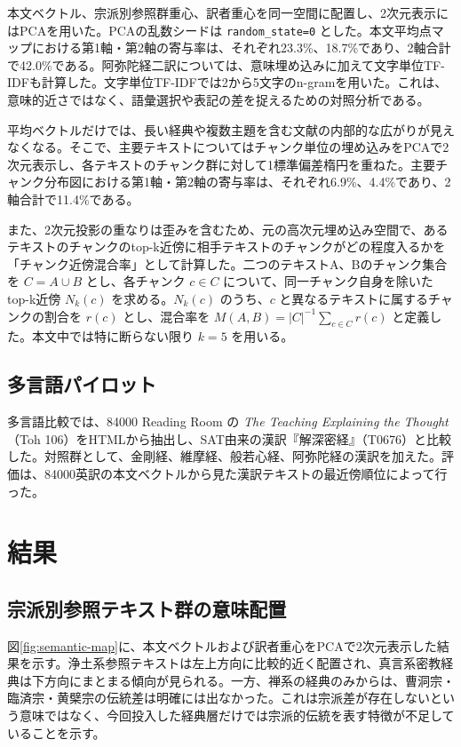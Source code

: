 \documentclass[uplatex,dvipdfmx,11pt,a4paper]{jsarticle}
\begin{document}
本文ベクトル、宗派別参照群重心、訳者重心を同一空間に配置し、2次元表示にはPCAを用いた。PCAの乱数シードは \texttt{random\_state=0} とした。本文平均点マップにおける第1軸・第2軸の寄与率は、それぞれ23.3\%、18.7\%であり、2軸合計で42.0\%である。阿弥陀経二訳については、意味埋め込みに加えて文字単位TF-IDFも計算した。文字単位TF-IDFでは2から5文字のn-gramを用いた。これは、意味的近さではなく、語彙選択や表記の差を捉えるための対照分析である。

平均ベクトルだけでは、長い経典や複数主題を含む文献の内部的な広がりが見えなくなる。そこで、主要テキストについてはチャンク単位の埋め込みをPCAで2次元表示し、各テキストのチャンク群に対して1標準偏差楕円を重ねた。主要チャンク分布図における第1軸・第2軸の寄与率は、それぞれ6.9\%、4.4\%であり、2軸合計で11.4\%である。

また、2次元投影の重なりは歪みを含むため、元の高次元埋め込み空間で、あるテキストのチャンクのtop-k近傍に相手テキストのチャンクがどの程度入るかを「チャンク近傍混合率」として計算した。二つのテキストA、Bのチャンク集合を $C=A\cup B$ とし、各チャンク $c\in C$ について、同一チャンク自身を除いたtop-k近傍 $N_k(c)$ を求める。$N_k(c)$ のうち、$c$ と異なるテキストに属するチャンクの割合を $r(c)$ とし、混合率を $M(A,B)=|C|^{-1}\sum_{c\in C} r(c)$ と定義した。本文中では特に断らない限り $k=5$ を用いる。

\subsection{多言語パイロット}

多言語比較では、84000 Reading Room の \textit{The Teaching Explaining the Thought}（Toh 106）をHTMLから抽出し、SAT由来の漢訳『解深密経』（T0676）と比較した。対照群として、金剛経、維摩経、般若心経、阿弥陀経の漢訳を加えた。評価は、84000英訳の本文ベクトルから見た漢訳テキストの最近傍順位によって行った。

\section{結果}

\subsection{宗派別参照テキスト群の意味配置}

図\ref{fig:semantic-map}に、本文ベクトルおよび訳者重心をPCAで2次元表示した結果を示す。浄土系参照テキストは左上方向に比較的近く配置され、真言系密教経典は下方向にまとまる傾向が見られる。一方、禅系の経典のみからは、曹洞宗・臨済宗・黄檗宗の伝統差は明確には出なかった。これは宗派差が存在しないという意味ではなく、今回投入した経典層だけでは宗派的伝統を表す特徴が不足していることを示す。
\end{document}
